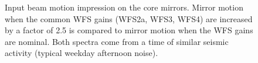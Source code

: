 \begin{figure}
\begin{centering}
\caption[Impression of input beam motion on the core mirrors]{Input beam motion impression on the core mirrors. Mirror
  motion when the common WFS gains (WFS2a, WFS3, WFS4) are increased by a
  factor of 2.5 is compared to mirror motion when the WFS gains are
  nominal. Both spectra come from a time of similar seismic activity
  (typical weekday afternoon noise).}
\label{fig:inputbeam_impression}
\end{centering}
\end{figure}


